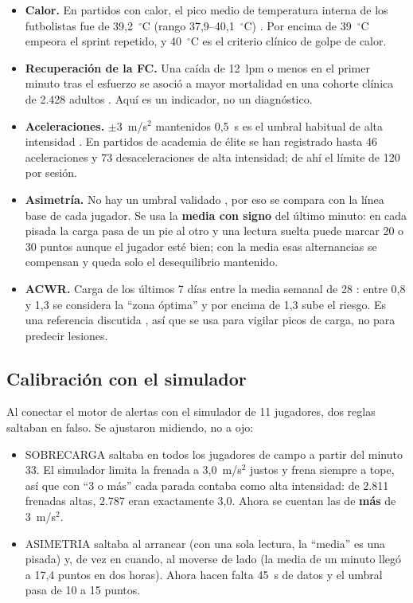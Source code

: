 \documentclass[runningheads]{llncs}
\begin{document}
\begin{itemize}
  \item \textbf{Calor.} En partidos con calor, el pico medio de temperatura interna de los futbolistas fue de 39,2~$^\circ$C (rango 37,9--40,1~$^\circ$C) \cite{tempfutbol,tempreview}. Por encima de 39~$^\circ$C empeora el sprint repetido, y 40~$^\circ$C es el criterio clínico de golpe de calor.
  \item \textbf{Recuperación de la FC.} Una caída de 12~lpm o menos en el primer minuto tras el esfuerzo se asoció a mayor mortalidad en una cohorte clínica de 2.428 adultos \cite{cole1999}. Aquí es un indicador, no un diagnóstico.
  \item \textbf{Aceleraciones.} $\pm3$~m/s$^2$ mantenidos 0,5~s es el umbral habitual de alta intensidad \cite{statsports,scisports}. En partidos de academia de élite se han registrado hasta 46 aceleraciones y 73 desaceleraciones de alta intensidad; de ahí el límite de 120 por sesión.
  \item \textbf{Asimetría.} No hay un umbral validado \cite{plantillas}, por eso se compara con la línea base de cada jugador. Se usa la \textbf{media con signo} del último minuto: en cada pisada la carga pasa de un pie al otro y una lectura suelta puede marcar 20 o 30 puntos aunque el jugador esté bien; con la media esas alternancias se compensan y queda solo el desequilibrio mantenido.
  \item \textbf{ACWR.} Carga de los últimos 7 días entre la media semanal de 28 \cite{gabbett2016}: entre 0,8 y 1,3 se considera la ``zona óptima'' y por encima de 1,3 sube el riesgo. Es una referencia discutida \cite{impellizzeri2020}, así que se usa para vigilar picos de carga, no para predecir lesiones.
\end{itemize}

\subsection{Calibración con el simulador}

Al conectar el motor de alertas con el simulador de 11 jugadores, dos reglas saltaban en falso. Se ajustaron midiendo, no a ojo:

\begin{itemize}
  \item SOBRECARGA saltaba en todos los jugadores de campo a partir del minuto 33. El simulador limita la frenada a 3,0~m/s$^2$ justos y frena siempre a tope, así que con ``3 o más'' cada parada contaba como alta intensidad: de 2.811 frenadas altas, 2.787 eran exactamente 3,0. Ahora se cuentan las de \textbf{más} de 3~m/s$^2$.
  \item ASIMETRIA saltaba al arrancar (con una sola lectura, la ``media'' es una pisada) y, de vez en cuando, al moverse de lado (la media de un minuto llegó a 17,4 puntos en dos horas). Ahora hacen falta 45~s de datos y el umbral pasa de 10 a 15 puntos.
\end{itemize}
\end{document}
